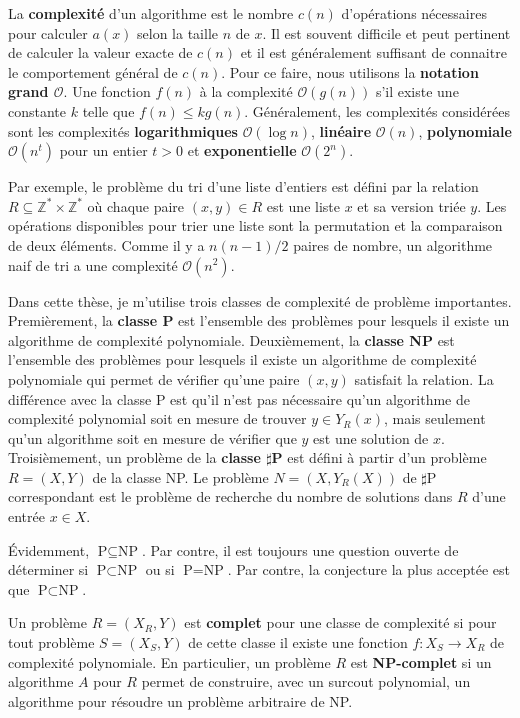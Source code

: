 La \textbf{complexité} d'un algorithme est le nombre $c(n)$ d'opérations nécessaires
pour calculer $a(x)$ selon la taille $n$ de $x$.
Il est souvent difficile et peut pertinent de calculer la valeur exacte de $c(n)$
et il est généralement suffisant de connaitre le comportement général de $c(n)$.
Pour ce faire,
nous utilisons la \textbf{notation grand $\mathcal O$}.
Une fonction $f(n)$ à la complexité $\mathcal O(g(n))$ s'il existe
une constante $k$ telle que $f(n) \leq k g(n)$.
Généralement,
les complexités considérées sont les complexités \textbf{logarithmiques} $\mathcal O(\log n)$,
\textbf{linéaire} $\mathcal O(n)$,
\textbf{polynomiale} $\mathcal O(n^t)$ pour un entier $t > 0$
et \textbf{exponentielle} $\mathcal O(2^n)$.

Par exemple,
le problème du tri d'une liste d'entiers est défini par la relation
$R \subseteq \mathbb Z^* \times \mathbb Z^*$
où chaque paire $(x, y) \in R$ est une liste $x$ et sa version triée $y$.
Les opérations disponibles pour trier une liste sont la permutation et
la comparaison de deux éléments.
Comme il y a $n(n-1)/2$ paires de nombre,
un algorithme naif de tri a une complexité $\mathcal O(n^2)$.

Dans cette thèse,
je m'utilise trois classes de complexité de problème importantes.
Premièrement,
la \textbf{classe P} est l'ensemble des problèmes
pour lesquels il existe un algorithme de complexité polynomiale.
Deuxièmement,
la \textbf{classe NP} est l'ensemble des problèmes
pour lesquels il existe un algorithme de complexité polynomiale
qui permet de vérifier qu'une paire $(x, y)$ satisfait la relation.
La différence avec la classe P est qu'il n'est pas nécessaire qu'un 
algorithme de complexité polynomial soit en mesure de trouver $y \in Y_R(x)$,
mais seulement qu'un algorithme soit en mesure de vérifier que $y$ est une solution
de $x$.
Troisièmement,
un problème de la \textbf{classe $\sharp$P} est défini à partir d'un problème
$R = (X, Y)$ de la classe NP.
Le problème $N = (X, Y_R(X))$ de $\sharp$P correspondant est le problème de
recherche du nombre de solutions dans $R$ d'une entrée $x \in X$.

Évidemment, $\text{P} \subseteq \text{NP}$.
Par contre, 
il est toujours une question ouverte de déterminer si
$\text{P} \subset \text{NP}$ ou si $\text{P} = \text{NP}$.
Par contre,
la conjecture la plus acceptée est que $\text{P} \subset \text{NP}$.

Un problème $R = (X_R, Y)$ est \textbf{complet} pour une classe de complexité
si pour tout problème $S = (X_S, Y)$ de cette classe il existe une fonction 
$f: X_S \to X_R$ de complexité polynomiale.
En particulier,
un problème $R$ est \textbf{NP-complet} si un algorithme $A$ pour $R$
permet de construire, avec un surcout polynomial,
un algorithme pour résoudre un problème arbitraire de NP.

